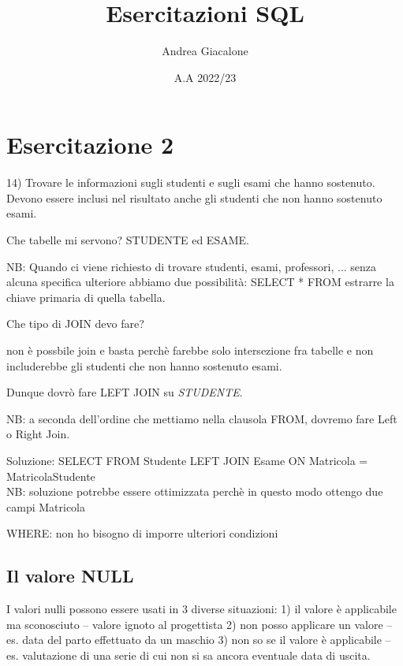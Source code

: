 \documentclass[12pt,a4paper]{book}
\title{Esercitazioni SQL}
\author{Andrea Giacalone}
\date{A.A 2022/23}
\begin{document}
\maketitle

\pagestyle{fancy}
\fancyhf{}
\fancyhf[EFC]{\thepage}
\fancyhf[OFC]{\thepage}


\chapter{Esercitazione 2}

14) Trovare le informazioni sugli studenti e sugli esami che hanno sostenuto. Devono essere inclusi nel risultato anche gli studenti che non hanno sostenuto esami.


Che tabelle mi servono? STUDENTE ed ESAME. 

NB: Quando ci viene richiesto di trovare studenti, esami, professori, ... senza alcuna specifica ulteriore abbiamo due possibilità:
    SELECT * FROM
    estrarre la chiave primaria di quella tabella.

Che tipo di JOIN devo fare?

non è possbile join e basta perchè farebbe solo intersezione fra tabelle e non includerebbe gli studenti che non hanno sostenuto esami.

Dunque dovrò fare LEFT JOIN su \emph{STUDENTE}.

NB: a seconda dell'ordine che mettiamo nella clausola FROM, dovremo fare Left o Right Join.

    Soluzione:
        SELECT
        FROM Studente LEFT JOIN Esame ON
            Matricola = MatricolaStudente\\
        NB: soluzione potrebbe essere ottimizzata perchè in questo modo ottengo
            due campi Matricola

        WHERE: non ho bisogno di imporre ulteriori condizioni

\section{Il valore NULL}
I valori nulli possono essere usati in 3 diverse situazioni:
    1) il valore è applicabile ma sconosciuto -- valore ignoto al progettista
    2) non posso applicare un valore -- es. data del parto effettuato da un maschio
    3) non so se il valore è applicabile  -- es. valutazione di una serie di cui non si sa ancora eventuale data di uscita.
\end{document}
